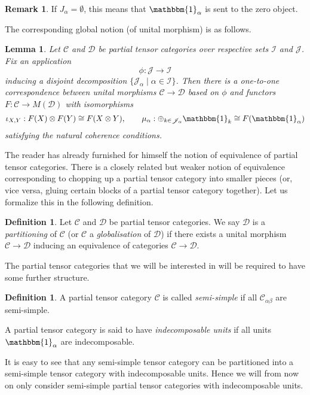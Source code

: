\documentclass[10pt]{article}
\newcommand{\CatC}{\mathcal{C}}
\newcommand{\CatD}{\mathcal{D}}
\newcommand{\CatCC}{\mathscr{C}}
\newcommand{\CatDD}{\mathscr{D}}
\newcommand{\Unitb}{\mathbbm{1}}
\newtheorem{Lem}[Theorem]{Lemma}
\theoremstyle{definition}
\newtheorem{Def}[Theorem]{Definition}
\newtheorem{Rem}[Theorem]{Remark}
\numberwithin{equation}{section}
\begin{document}
\begin{Rem} If $J_{\alpha}=\emptyset$, this means that $\Unitb_{\alpha}$ is sent to the zero object.
\end{Rem} 

The corresponding global notion (of unital morphism) is as follows.

\begin{Lem} Let $\CatCC$ and $\CatDD$ be partial tensor categories over respective sets $\mathscr{I}$ and $\mathscr{J}$. Fix an application \[\phi: \mathscr{J}\rightarrow \mathscr{I}\] inducing a disjoint decomposition $\{\mathscr{J}_\alpha\mid \alpha\in \mathscr{I}\}$. Then there is a one-to-one correspondence between unital morphisms $\CatCC\rightarrow \CatDD$ based on $\phi$ and functors $F:\CatC \rightarrow M(\CatD)$ with isomorphisms \[\iota_{X,Y}:F(X)\otimes F(Y)\cong F(X\otimes Y),\qquad \mu_\alpha:\oplus_{k\in \mathscr{J}_\alpha} \Unitb_k \cong F(\Unitb_\alpha)\] satisfying the natural coherence conditions. 
\end{Lem} 

The reader has already furnished for himself the notion of equivalence of partial tensor categories. There is a closely related but weaker notion of equivalence corresponding to chopping up a partial tensor category into smaller pieces (or, vice versa, gluing certain blocks of a partial tensor category together). Let us formalize this in the following definition.

\begin{Def} Let $\CatCC$ and $\CatDD$ be partial tensor categories. We say $\CatDD$ is a \emph{partitioning} of $\CatCC$ (or $\CatCC$ a \emph{globalisation} of $\CatDD$) if there exists a unital morphism $\CatCC\rightarrow \CatDD$ inducing an equivalence of categories $\CatC\rightarrow \CatD$.
\end{Def}

The partial tensor categories that we will be interested in will be required to have some further structure. 

\begin{Def} A partial tensor category $\CatCC$ is called \emph{semi-simple} if all $\CatC_{\alpha\beta}$ are semi-simple. 

A partial tensor category is said to have \emph{indecomposable units} if all units $\Unitb_\alpha$ are indecomposable. 
\end{Def}

It is easy to see that any semi-simple tensor category can be partitioned into a semi-simple tensor category with indecomposable units.  Hence we will from now on only consider semi-simple partial tensor categories with indecomposable units.
 
\end{document}
